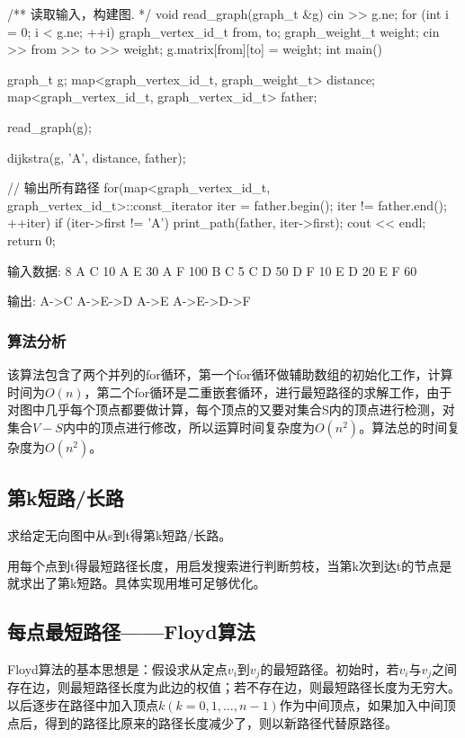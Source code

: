 \begin{Codex}[label=al_graph_dijkstra.cpp]
    /** 读取输入，构建图. */
    void read_graph(graph_t &g) {
        cin >> g.ne;
        for (int i = 0; i < g.ne; ++i) {
            graph_vertex_id_t from, to;
            graph_weight_t weight;
            cin >> from >> to >> weight;
            g.matrix[from][to] = weight;
        }
    }
        int main() {
        graph_t g;
        map<graph_vertex_id_t, graph_weight_t> distance;
        map<graph_vertex_id_t, graph_vertex_id_t> father;

        read_graph(g);

        dijkstra(g, 'A', distance, father);

        // 输出所有路径
        for(map<graph_vertex_id_t, graph_vertex_id_t>::const_iterator iter =
                father.begin(); iter != father.end();  ++iter) {
            if (iter->first != 'A') {
                print_path(father, iter->first);
                cout << endl;
            }
        }
        return 0;
    }

    输入数据:
        8
        A C 10
        A E 30
        A F 100
        B C 5
        C D 50
        D F 10
        E D 20
        E F 60

    输出:
        A->C
        A->E->D
        A->E
        A->E->D->F
\end{Codex}

\subsubsection{算法分析}
该算法包含了两个并列的for循环，第一个for循环做辅助数组的初始化工作，计算时间为$O(n)$，第二个for循环是二重嵌套循环，进行最短路径的求解工作，由于对图中几乎每个顶点都要做计算，每个顶点的又要对集合S内的顶点进行检测，对集合$V-S$内中的顶点进行修改，所以运算时间复杂度为$O(n^2)$。算法总的时间复杂度为$O(n^2)$。

\subsection{第k短路/长路}
求给定无向图中从s到t得第k短路/长路。

用每个点到t得最短路径长度，用启发搜索进行判断剪枝，当第k次到达t的节点是就求出了第k短路。具体实现用堆可足够优化。

\subsection{每点最短路径——Floyd算法}
Floyd算法的基本思想是：假设求从定点$v_i$到$v_j$的最短路径。初始时，若$v_i$与$v_j$之间存在边，则最短路径长度为此边的权值；若不存在边，则最短路径长度为无穷大。以后逐步在路径中加入顶点$k(k=0,1,...,n-1)$作为中间顶点，如果加入中间顶点后，得到的路径比原来的路径长度减少了，则以新路径代替原路径。

